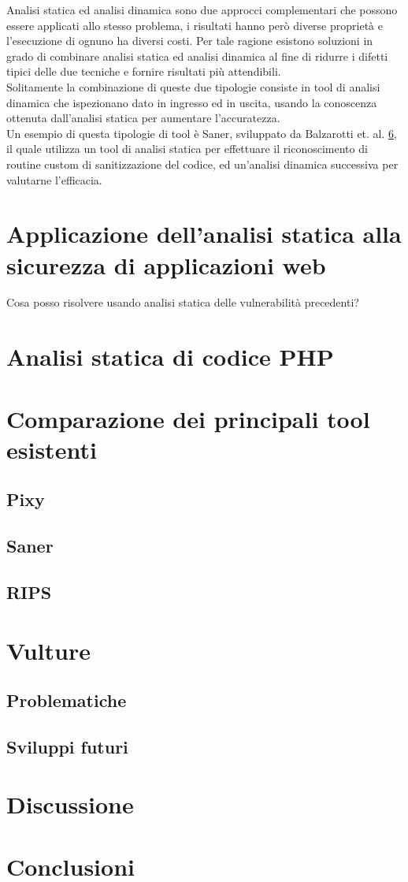 Analisi statica ed analisi dinamica sono due approcci complementari che possono essere applicati allo stesso problema, i risultati hanno però diverse proprietà e l'esecuzione di ognuno ha diversi costi. Per tale ragione esistono soluzioni in grado di combinare analisi statica ed analisi dinamica al fine di ridurre i difetti tipici delle due tecniche e fornire risultati più attendibili.\\
Solitamente la combinazione di queste due tipologie consiste in tool di analisi dinamica che ispezionano dato in ingresso ed in uscita, usando la conoscenza ottenuta dall'analisi statica per aumentare l'accuratezza.\\
Un esempio di questa tipologie di tool è Saner, sviluppato da Balzarotti et. al. \ref{}, il quale utilizza un tool di analisi statica per effettuare il riconoscimento di routine custom  di sanitizzazione del codice, ed un'analisi dinamica successiva per valutarne l'efficacia. 

\chapter{Applicazione dell'analisi statica alla sicurezza di applicazioni web}
Cosa posso risolvere usando analisi statica delle vulnerabilità precedenti?

\chapter{Analisi statica di codice PHP}

\chapter{Comparazione dei principali tool esistenti}

\section{Pixy}

\section{Saner}

\section{RIPS}

\chapter{Vulture}

\section{Problematiche}

\section{Sviluppi futuri}

\chapter{Discussione}

\chapter{Conclusioni}